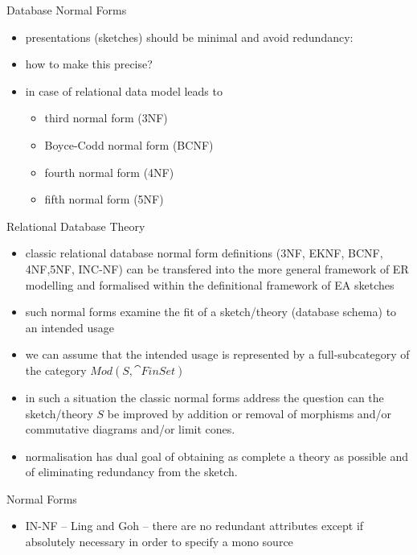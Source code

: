 \begin{frame}{Database Normal Forms}
\begin{itemize}
\item presentations (sketches) should be minimal and avoid redundancy:
\item how to make this precise?
\item in case of relational data model leads to 
   \begin{itemize}
     \item third normal form (3NF)
     \item Boyce-Codd normal form (BCNF)
     \item fourth normal form (4NF)
     \item fifth normal form (5NF)
   \end{itemize}
\end{itemize}
\end{frame}

\begin{frame}{Relational Database Theory}
\begin{itemize}
\item classic relational database normal form definitions ({\scriptsize 3NF, EKNF, BCNF, 4NF,5NF, INC-NF}) can be transfered into the more general framework
of ER modelling and formalised within the definitional framework of EA sketches

\item such normal forms  examine the fit of a sketch/theory (database schema) to an intended usage

\item we can assume that the intended usage is represented by a full-subcategory of the category $Mod(S,\cat{FinSet})$

\item in such a situation the classic normal forms address the question can the sketch/theory $S$ be improved by addition or removal of morphisms and/or commutative diagrams and/or limit cones.
\item normalisation has dual goal of obtaining as complete a theory as possible and of eliminating redundancy from the sketch.  
\end{itemize}
\end{frame}

\begin{frame}{Normal Forms}
\begin{itemize}
\item IN-NF -- Ling and Goh -- there are no redundant attributes except if absolutely necessary in order to specify a mono source
\end{itemize}
\end{frame}

